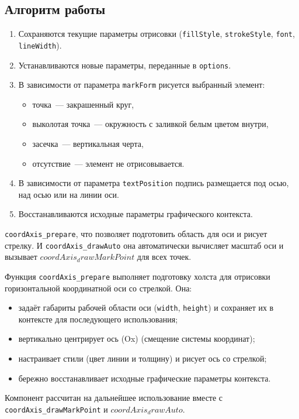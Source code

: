\subsection{Алгоритм работы}
\begin{enumerate}
    \item Сохраняются текущие параметры отрисовки (\texttt{fillStyle}, \texttt{strokeStyle}, \texttt{font}, \texttt{lineWidth}).
    \item Устанавливаются новые параметры, переданные в \texttt{options}.
    \item В зависимости от параметра \texttt{markForm} рисуется выбранный элемент:
    \begin{itemize}
        \item точка~— закрашенный круг,
        \item выколотая точка~— окружность с заливкой белым цветом внутри,
        \item засечка~— вертикальная черта,
        \item отсутствие~— элемент не отрисовывается.
    \end{itemize}
    \item В зависимости от параметра \texttt{textPosition} подпись размещается под осью, над осью или на линии оси.
    \item Восстанавливаются исходные параметры графического контекста.
\end{enumerate}

 \texttt{coordAxis\_prepare}, что позволяет подготовить область для оси и рисует стрелку. И
\texttt{coordAxis\_drawAuto} она автоматически вычисляет масштаб оси и вызывает $coordAxis_drawMarkPoint$ для всех точек.


Функция \texttt{coordAxis\_prepare} выполняет подготовку холста для отрисовки горизонтальной координатной оси со стрелкой.
Она:
\begin{itemize}
  \item задаёт габариты рабочей области оси (\verb|width|, \verb|height|) и сохраняет их в контексте для последующего использования;
  \item вертикально центрирует ось (Ox) (смещение системы координат);
  \item настраивает стили (цвет линии и толщину) и рисует ось со стрелкой;
  \item бережно восстанавливает исходные графические параметры контекста.
\end{itemize}
Компонент рассчитан на дальнейшее использование вместе с \texttt{coordAxis\_drawMarkPoint} и $coordAxis_drawAuto$.

